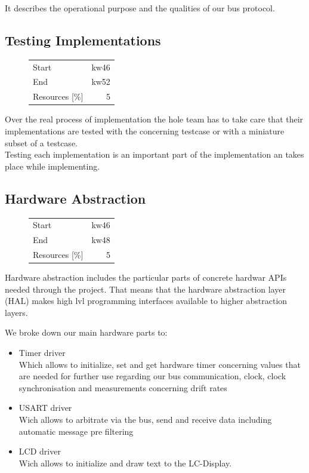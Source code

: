 It describes the operational purpose and the qualities of our bus protocol.
\subsection{Testing Implementations}
\begin{figure}
\begin{tabular}[t]{|lr|}
\hline
Start & kw46\\
End & kw52\\
Resources [\%] & 5\\
\hline
\end{tabular}
\end{figure}
Over the real process of implementation the hole team has to take care that their 
implementations are tested with the concerning testcase or with a miniature subset of a testcase.\\

Testing each implementation is an important part of the implementation an takes place while
implementing.
\subsection{Hardware Abstraction}
\begin{figure}
\begin{tabular}[t]{|lr|}
\hline
Start & kw46\\
End & kw48\\
Resources [\%] & 5\\
\hline
\end{tabular}
\end{figure}
Hardware abstraction includes the particular parts of concrete hardwar APIs needed through the project. 
That means that the hardware abstraction layer (HAL) makes high lvl programming interfaces available to 
higher abstraction layers.

We broke down our main hardware parts to:
\begin{itemize}
 \item Timer driver\\
Which allows to initialize, set and get hardware timer concerning values that are needed
for further use regarding our bus communication, clock, clock synchronisation and 
measurements concerning drift rates
 \item USART driver\\
Wich allows to arbitrate via the bus, send and receive data including automatic message 
pre filtering
 \item LCD driver\\
Wich allows to initialize and draw text to the LC-Display.
\end{itemize}

